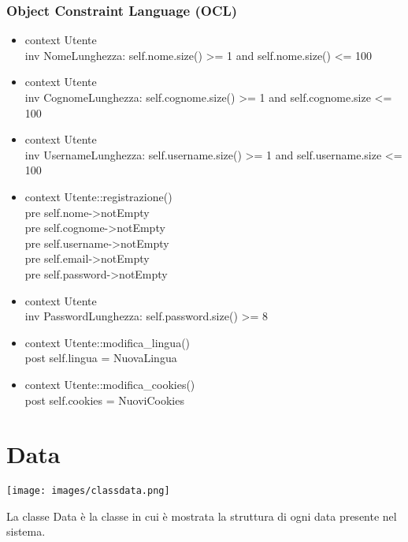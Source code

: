 \documentclass[a4paper,12pt]{article}
\begin{document}
\subsubsection*{Object Constraint Language (OCL)}
\begin{itemize}
\item {\ttfamily context Utente \\inv NomeLunghezza: self.nome.size() >= 1 and self.nome.size() <= 100}
\item {\ttfamily context Utente \\inv CognomeLunghezza: self.cognome.size() >= 1 and self.cognome.size <= 100}
\item {\ttfamily context Utente \\inv UsernameLunghezza: self.username.size() >= 1 and self.username.size <= 100}
\item {\ttfamily context Utente::registrazione() \\pre self.nome->notEmpty \\pre self.cognome->notEmpty
\\pre self.username->notEmpty
\\pre self.email->notEmpty
\\pre self.password->notEmpty}
\item {\ttfamily context Utente \\inv PasswordLunghezza: self.password.size() >= 8}
\item {\ttfamily context Utente::modifica\_lingua() 
\\post self.lingua = NuovaLingua}
\item {\ttfamily context Utente::modifica\_cookies() 
\\post self.cookies = NuoviCookies}
\end{itemize}

\newpage
\section{Data}
\begin{center}
  \texttt{[image: images/classdata.png]}
\end{center}
La classe {\sffamily Data} è la classe in cui è mostrata la struttura di ogni data presente nel sistema. 
\end{document}
